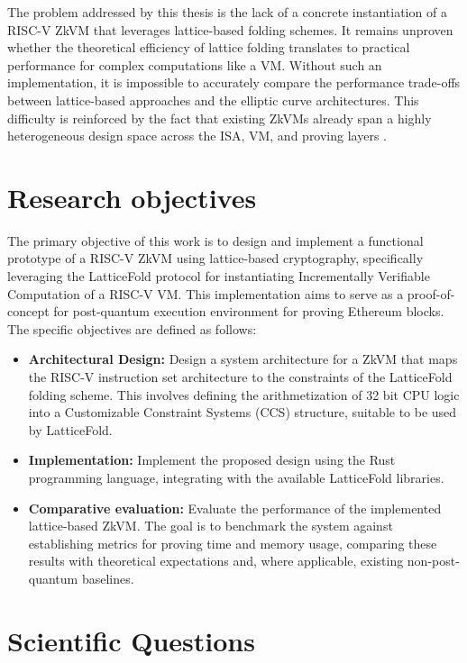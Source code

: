 The problem addressed by this thesis is the lack of a concrete instantiation
of a RISC-V ZkVM that leverages lattice-based folding schemes. It remains
unproven whether the theoretical efficiency of lattice folding translates to
practical performance for complex computations like a VM. Without such an
implementation, it is impossible to accurately compare the performance
trade-offs between lattice-based approaches and the elliptic curve architectures.
This difficulty is reinforced by the fact that existing ZkVMs already span a
highly heterogeneous design space across the ISA, VM, and proving layers
\cite{SoKZkVMs}.

\section{Research objectives}

The primary objective of this work is to design and implement a functional
prototype of a RISC-V ZkVM using lattice-based cryptography, specifically
leveraging the LatticeFold protocol for instantiating Incrementally Verifiable
Computation of a RISC-V VM. This implementation aims to serve as a
proof-of-concept for post-quantum execution environment for proving
Ethereum blocks. The specific objectives are defined as follows:

\begin{itemize}
	\item \textbf{Architectural Design: } Design a system architecture for a
	      ZkVM that maps the RISC-V instruction set architecture to the
	      constraints of the LatticeFold folding scheme. This involves defining
	      the arithmetization of 32 bit CPU logic into a Customizable Constraint
	      Systems (CCS) \cite{CCS} structure, suitable to be used by LatticeFold.
	\item \textbf{Implementation:} Implement the proposed design using the
	      Rust programming language, integrating with the available LatticeFold
	      libraries.
	\item \textbf{Comparative evaluation:} Evaluate the performance of the
	      implemented lattice-based ZkVM. The goal is to benchmark the system
	      against establishing metrics for proving time and memory usage,
	      comparing these results with theoretical expectations and, where
	      applicable, existing non-post-quantum baselines.
\end{itemize}

\section{Scientific Questions}

